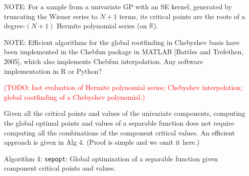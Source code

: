 \documentclass{article}
\newcommand{\todo}[1]{\textcolor{red}{(#1)}}
\begin{document}
NOTE: For a sample from a univariate GP with an SE kernel, generated by
truncating the Wiener series to $N+1$ terms, its critical points are
the roots of a degree-$(N+1)$ Hermite polynomial series (on
$\mathbb{R}$).

NOTE: Efficient algorithms for the global rootfinding in Chebyshev basis
have been implemented in the Chebfun package in MATLAB [Battles and
Trefethen, 2005], which also implements Chebfun
interpolation. Any software implementation in R or Python?

\todo{TODO: fast evaluation of Hermite polynomial series; Chebyshev
interpolation; global rootfinding of a Chebyshev polynomial.}

Given all the critical points and values of the univariate components,
computing the global optimal points and values of a separable function
does not require computing all the combinations of the component
critical values. An efficient approach is given in Alg 4. (Proof is
simple and we omit it here.)

Algorithm 4: \texttt{sepopt}: Global optimization of a separable
function given component critical points and values.
\end{document}
